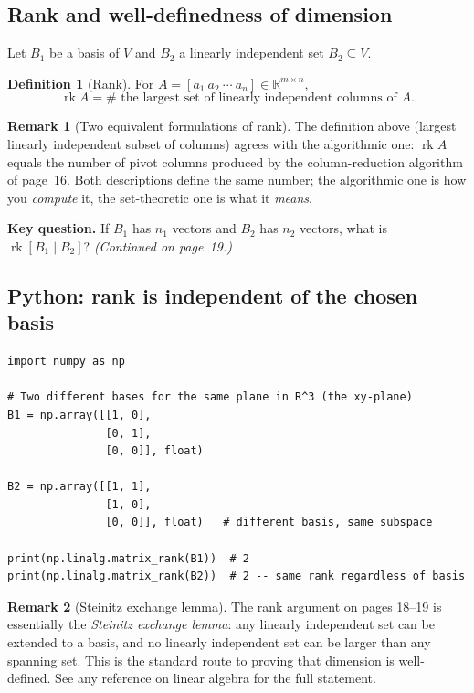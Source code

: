 \documentclass[11pt]{article}
\theoremstyle{definition}
\newtheorem{definition}{Definition}[section]
\newtheorem{remark}{Remark}[section]
\theoremstyle{plain}
\begin{document}
\subsection{Rank and well-definedness of dimension}

Let $B_1$ be a basis of $V$ and $B_2$ a linearly independent set
$B_2 \subseteq V$.

\begin{definition}[Rank]
  For $A = [a_1\ a_2\ \cdots\ a_n] \in \mathbb{R}^{m \times n}$,
  \[
    \operatorname{rk} A
    = \#\text{ the largest set of linearly independent columns of } A.
  \]
\end{definition}

\begin{remark}[Two equivalent formulations of rank]
  The definition above (largest linearly independent subset of columns)
  agrees with the algorithmic one: $\operatorname{rk} A$ equals the number
  of pivot columns produced by the column-reduction algorithm of page~16.
  Both descriptions define the same number; the algorithmic one is how you
  \emph{compute} it, the set-theoretic one is what it \emph{means}.
\end{remark}

\noindent
\textbf{Key question.}  If $B_1$ has $n_1$ vectors and $B_2$ has $n_2$
vectors, what is $\operatorname{rk}[B_1 \mid B_2]$?
\emph{(Continued on page~19.)}

\subsection{Python: rank is independent of the chosen basis}
\begin{lstlisting}
import numpy as np

# Two different bases for the same plane in R^3 (the xy-plane)
B1 = np.array([[1, 0],
               [0, 1],
               [0, 0]], float)

B2 = np.array([[1, 1],
               [1, 0],
               [0, 0]], float)   # different basis, same subspace

print(np.linalg.matrix_rank(B1))  # 2
print(np.linalg.matrix_rank(B2))  # 2 -- same rank regardless of basis
\end{lstlisting}

\begin{remark}[Steinitz exchange lemma]
  The rank argument on pages 18--19 is essentially the
  \emph{Steinitz exchange lemma}: any linearly independent set can be
  extended to a basis, and no linearly independent set can be larger than
  any spanning set.  This is the standard route to proving that dimension
  is well-defined.  See any reference on linear algebra for the full
  statement.
\end{remark}
\end{document}
